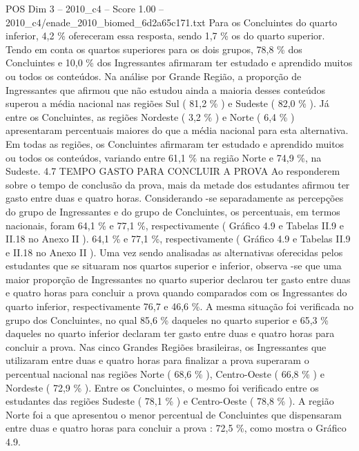 \begin{textsample}{POS Dim 3 – 2010\_c4 – Score 1.00 – 2010\_c4/enade\_2010\_biomed\_6d2a65c171.txt}
Para os Concluintes do quarto inferior, 4,2 \% ofereceram essa resposta, sendo 1,7 \% os do quarto superior.
Tendo em conta os quartos superiores para os dois grupos, 78,8 \% dos Concluintes e 10,0 \% dos Ingressantes afirmaram ter estudado e aprendido muitos ou todos os conteúdos.
Na análise por Grande Região, a proporção de Ingressantes que afirmou que não estudou ainda a maioria desses conteúdos superou a média nacional nas regiões Sul ( 81,2 \% ) e Sudeste ( 82,0 \% ).
Já entre os Concluintes, as regiões Nordeste ( 3,2 \% ) e Norte ( 6,4 \% ) apresentaram percentuais maiores do que a média nacional para esta alternativa.
Em todas as regiões, os Concluintes afirmaram ter estudado e aprendido muitos ou todos os conteúdos, variando entre 61,1 \% na região Norte e 74,9 \%, na Sudeste. 4.7 TEMPO GASTO PARA CONCLUIR A PROVA Ao responderem sobre o tempo de conclusão da prova, mais da metade dos estudantes afirmou ter gasto entre duas e quatro horas.
Considerando -se separadamente as percepções do grupo de Ingressantes e do grupo de Concluintes, os percentuais, em termos nacionais, foram 64,1 \% e 77,1 \%, respectivamente ( Gráfico 4.9 e Tabelas II.9 e II.18 no Anexo II ). 64,1 \% e 77,1 \%, respectivamente ( Gráfico 4.9 e Tabelas II.9 e II.18 no Anexo II ).
Uma vez sendo analisadas as alternativas oferecidas pelos estudantes que se situaram nos quartos superior e inferior, observa -se que uma maior proporção de Ingressantes no quarto superior declarou ter gasto entre duas e quatro horas para concluir a prova quando comparados com os Ingressantes do quarto inferior, respectivamente 76,7 e 46,6 \%.
A mesma situação foi verificada no grupo dos Concluintes, no qual 85,6 \% daqueles no quarto superior e 65,3 \% daqueles no quarto inferior declaram ter gasto entre duas e quatro horas para concluir a prova.
Nas cinco Grandes Regiões brasileiras, os Ingressantes que utilizaram entre duas e quatro horas para finalizar a prova superaram o percentual nacional nas regiões Norte ( 68,6 \% ), Centro-Oeste ( 66,8 \% ) e Nordeste ( 72,9 \% ).
Entre os Concluintes, o mesmo foi verificado entre os estudantes das regiões Sudeste ( 78,1 \% ) e Centro-Oeste ( 78,8 \% ).
A região Norte foi a que apresentou o menor percentual de Concluintes que dispensaram entre duas e quatro horas para concluir a prova : 72,5 \%, como mostra o Gráfico 4.9.

\end{textsample}
